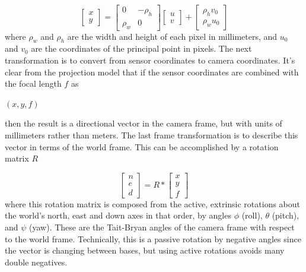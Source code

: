 \[
\begin{bmatrix} x \\ y \end{bmatrix}
=
\begin{bmatrix} 
 0 & -\rho_h \\
 \rho_w & 0 
\end{bmatrix}
\begin{bmatrix} u \\ v \end{bmatrix}
+
\begin{bmatrix} \rho_h v_0 \\ \rho_w u_0 \end{bmatrix}
\]
 where $\rho_w$ and $\rho_h$ are the width and height of each pixel in millimeters, and $u_0$ and $v_0$ are the coordinates of the principal point in pixels.   The next transformation is to convert from sensor coordinates to camera coordinates.  It's clear from the projection model that if the sensor coordinates are combined with the focal length $f$ as
 \begin{center}
 $(x,y,f)$
 \end{center}
 then the result is a directional vector in the camera frame, but with units of millimeters rather than meters. The last frame transformation is to describe this vector in terms of the world frame.  This can be accomplished by a rotation matrix $R$
 
 \begin{equation}
 \label{rotation_eq}
 \begin{bmatrix} n \\ e \\ d \end{bmatrix}
 =
 R *
 \begin{bmatrix} x \\ y \\ f \end{bmatrix}
 \end{equation}
 where this rotation matrix is composed from the active, extrinsic rotations about the world's north, east and down axes in that order, by angles $\phi$ (roll), $\theta$ (pitch), and $\psi$ (yaw).  These are the Tait-Bryan angles of the camera frame with respect to the world frame.  Technically, this is a passive rotation by negative angles since the vector is changing between bases, but using active rotations avoids many double negatives.
 

